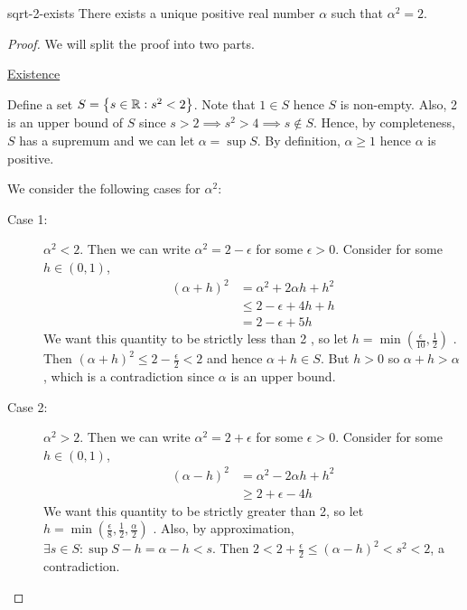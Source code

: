 \documentclass{styles/tufte}
\begin{document}
      \begin{theorem}{}{sqrt-2-exists}
        There exists a unique positive real number $\alpha$ such that $\alpha^2 = 2$.
      \end{theorem}
      \begin{proof}
        We will split the proof into two parts.

        {\flushleft\underline{Existence}}
        
        Define a set $S = \set{s \in \mathbb{R}: s^2 < 2}$. Note that $1 \in S$ hence $S$ is non-empty. Also, 2 is an upper bound of $S$ since $s > 2 \implies s^2 > 4 \implies s \notin S$. Hence, by completeness, $S$ has a supremum and we can let $\alpha = \sup S$. By definition, $\alpha \geqslant 1$ hence $\alpha$ is positive.
        
        We consider the following cases for $\alpha^2$:
        
        \begin{description}
          \item[Case 1:] $\alpha^2 < 2$. Then we can write $\alpha^2 = 2 - \epsilon$ for some $\epsilon > 0$. Consider for some $h \in (0, 1)$,
          \begin{align*}
            (\alpha + h)^2 &= \alpha^2 + 2\alpha h + h^2 \\
            &\leqslant 2 - \epsilon + 4h + h \\
            &= 2 - \epsilon + 5h
          \end{align*}
          We want this quantity to be strictly less than 2 , so let $h = \min\left(\frac{\epsilon}{10}, \frac{1}{2}\right)$ . Then $(\alpha + h)^2 \leqslant 2 - \frac{\epsilon}{2} < 2$ and hence $\alpha + h \in S$. But $h > 0$ so $\alpha + h > \alpha$, which is a contradiction since $\alpha$ is an upper bound.
          
          \item[Case 2:] $\alpha^2 > 2$. Then we can write $\alpha^2 = 2 + \epsilon$ for some $\epsilon > 0$. Consider for some $h \in (0, 1)$,
          \begin{align*}
            (\alpha - h)^2 &= \alpha^2 - 2\alpha h + h^2 \\
            &\geqslant 2 + \epsilon - 4h
          \end{align*}
          We want this quantity to be strictly greater than 2, so let $h = \min\left(\frac{\epsilon}{8}, \frac{1}{2}, \frac{\alpha}{2}\right)$ . Also, by approximation, $\exists s \in S : \sup S - h = \alpha - h < s$. Then $2 < 2 + \frac{\epsilon}{2} \leqslant (\alpha - h)^2 < s^2 < 2$, a contradiction.
        \end{description}
        

\end{proof}
\end{document}
